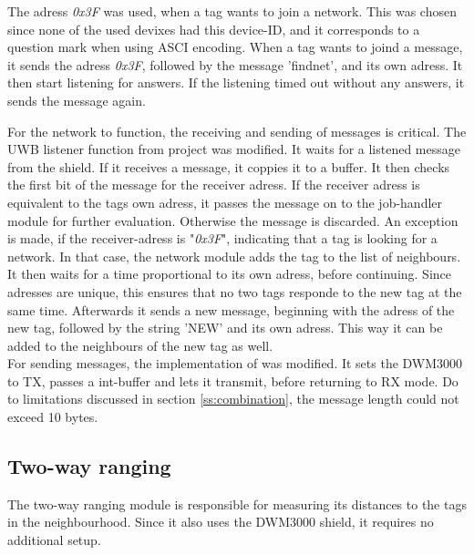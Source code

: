 The adress \textit{0x3F} was used, when a tag wants to join a network.
This was chosen since none of the used devixes had this device-ID, and it corresponds to a question mark when using ASCI encoding.
When a tag wants to joind a message, it sends the adress \textit{0x3F}, followed by the message 'findnet', and its own adress.
It then start listening for answers.
If the listening timed out without any answers, it sends the message again.


For the network to function, the receiving and sending of messages is critical.
The UWB listener function from project \cite{degkwitz2023ultrawideband} was modified.
It waits for a listened message from the shield.
If it receives a message, it coppies it to a buffer.
It then checks the first bit of the message for the receiver adress.
If the receiver adress is equivalent to the tags own adress, it passes the message on to the job-handler module for further evaluation.
Otherwise the message is discarded.
An exception is made, if the receiver-adress is "\textit{0x3F}", indicating that a tag is looking for a network.
In that case, the network module adds the tag to the list of neighbours.
It then waits for a time proportional to its own adress, before continuing.
Since adresses are unique, this ensures that no two tags responde to the new tag at the same time.
Afterwards it sends a new message, beginning with the adress of the new tag, followed by the string 'NEW' and its own adress.
This way it can be added to the neighbours of the new tag as well.\\
For sending messages, the implementation of \cite{degkwitz2023ultrawideband} was modified.
It sets the DWM3000 to TX, passes a int-buffer and lets it transmit, before returning to RX mode.
Do to limitations discussed in section \ref{ss:combination}, the message length could not exceed 10 bytes. 


\subsection{Two-way ranging}
\label{ss:two_way_ranging}
The two-way ranging module is responsible for measuring its distances to the tags in the neighbourhood.
Since it also uses the DWM3000 shield, it requires no additional setup.


